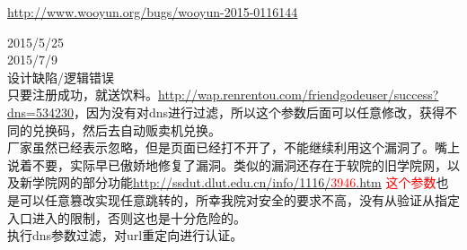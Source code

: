 \documentclass{leptc}
\begin{document}
    \begin{center}
    	\url{http://www.wooyun.org/bugs/wooyun-2015-0116144}
    \end{center}
     2015/5/25 \\
     2015/7/9 \\
     设计缺陷/逻辑错误 \\
     只要注册成功，就送饮料。\url{http://wap.renrentou.com/friendgodeuser/success?dns=534230}，因为没有对dns进行过滤，所以这个参数后面可以任意修改，获得不同的兑换码，然后去自动贩卖机兑换。\\
     厂家虽然已经表示忽略，但是页面已经打不开了，不能继续利用这个漏洞了。嘴上说着不要，实际早已傲娇地修复了漏洞。类似的漏洞还存在于软院的旧学院网，以及新学院网的部分功能\href{http://ssdut.dlut.edu.cn/info/1116/3946.htm}{http://ssdut.dlut.edu.cn/info/1116/\textcolor{red}{3946}.htm} \textcolor{red}{这个参数}也是可以任意篡改实现任意跳转的，所幸我院对安全的要求不高，没有从验证从指定入口进入的限制，否则这也是十分危险的。\\
     执行dns参数过滤，对url重定向进行认证。\\
\end{document}
